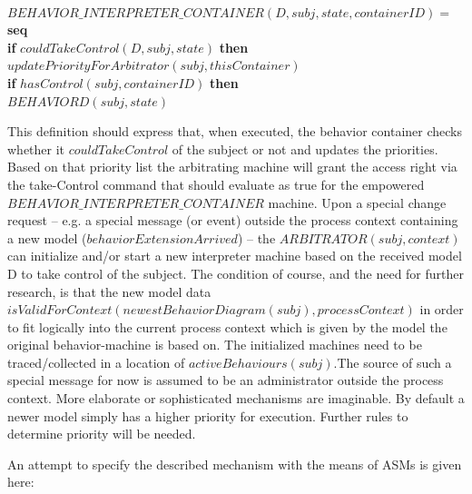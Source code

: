 {\newcommand\tab[1][1cm]{\hspace*{#1}}\begin{small}\begin{textit} \noindent  \\
$BEHAVIOR\_INTERPRETER\_CONTAINER(D, subj, state, containerID ) =$ \\
    \indent \textbf{seq} \\
    \indent \textbf{if} $couldTakeControl(D, subj,state)$ \textbf{then} \\
    \indent \tab $updatePriorityForArbitrator(subj, thisContainer)$ \\
    \indent \textbf{if} $hasControl(subj, containerID)$  \textbf{then} \\
    \indent \tab$BEHAVIORD(subj,state)$ \\
\end{textit}\end{small}}
\bigskip


This definition should express that, when executed, the behavior container checks whether it $couldTakeControl$ of the subject or not and updates the priorities. Based on that priority list the arbitrating machine will grant the access right via the take-Control command that should evaluate as true for the empowered $BEHAVIOR\_INTERPRETER\_CONTAINER$ machine. 
Upon a special change request – e.g. a special message (or event) outside the process context containing a new model ($behaviorExtensionArrived$) – the $ARBITRATOR(subj, context)$ can initialize and/or start a new interpreter machine based on the received model D to take control of the subject. The condition of course, and the need for further research, is that the new model data $isValidForContext(newestBehaviorDiagram(subj), processContext)$ in order to fit logically into the current process context which is given by the model the original behavior-machine is based on. The initialized machines need to be traced/collected in a location of $activeBehaviours(subj)$.The source of such a special message for now is assumed to be an administrator outside the process context. More elaborate or sophisticated mechanisms are imaginable.  By default a newer model simply has a higher priority for execution. Further rules to determine priority will be needed. 

An attempt to specify the described mechanism with the means of ASMs is given here:

